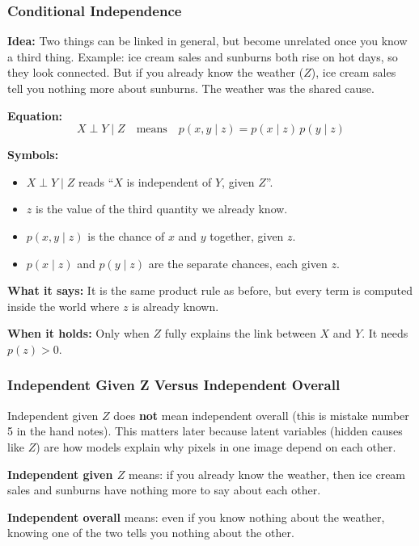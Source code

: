\subsubsection*{Conditional Independence}

\textbf{Idea:} Two things can be linked in general, but become unrelated once you know a third thing. Example: ice cream sales and sunburns both rise on hot days, so they look connected. But if you already know the weather ($Z$), ice cream sales tell you nothing more about sunburns. The weather was the shared cause.

\textbf{Equation:}
\[
X \perp Y \mid Z \quad \text{means} \quad p(x, y \mid z) = p(x \mid z)\,p(y \mid z)
\]

\textbf{Symbols:}
\begin{itemize}
  \item $X \perp Y \mid Z$ reads ``$X$ is independent of $Y$, given $Z$''.
  \item $z$ is the value of the third quantity we already know.
  \item $p(x, y \mid z)$ is the chance of $x$ and $y$ together, given $z$.
  \item $p(x \mid z)$ and $p(y \mid z)$ are the separate chances, each given $z$.
\end{itemize}

\textbf{What it says:} It is the same product rule as before, but every term is computed inside the world where $z$ is already known.

\textbf{When it holds:} Only when $Z$ fully explains the link between $X$ and $Y$. It needs $p(z) > 0$.

\subsubsection*{Independent Given Z Versus Independent Overall}

Independent given $Z$ does \textbf{not} mean independent overall (this is mistake number 5 in the hand notes). This matters later because latent variables (hidden causes like $Z$) are how models explain why pixels in one image depend on each other.

\textbf{Independent given $Z$} means: if you already know the weather, then ice cream sales and sunburns have nothing more to say about each other.

\textbf{Independent overall} means: even if you know nothing about the weather, knowing one of the two tells you nothing about the other.


